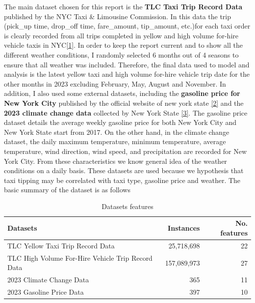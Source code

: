 \documentclass[11pt]{article}
\begin{document}
The main dataset chosen for this report is the \textbf{TLC Taxi Trip Record Data} published by the NYC Taxi \& Limousine Commission. In this data the trip 
(pick\_up time, drop\_off time, fare\_amount, tip\_amount, etc.)for each taxi order is clearly recorded from all trips completed in yellow and high volume for-hire 
vehicle taxis in NYC\href{https://www.nyc.gov/site/tlc/about/tlc-trip-record-data.page}{[1]}. In order to keep the report current and to show all the different weather 
conditions, I randomly selected 6 months out of 4 seasons to ensure that all weather was included. Therefore, the final data used to model and analysis is the latest 
yellow taxi and high volume for-hire vehicle trip date for the other months in 2023 excluding February, May, August and November.
In addition, I also used some external datasets, including the \textbf{gasoline price for New York City} published by the official website of new york state
\href{https://data.ny.gov/zh/Energy-Environment/Gasoline-Prices/wuxr-ni2i}{[2]} and the \textbf{2023 climate change data} collected by New York State
\href{https://meteostat.net/en/station/KNYC0?t=2023-01-01/2023-12-31}{[3]}. The gasoline price dataset 
details the average weekly gasoline price for both New York City and New York State start from 2017. On the other hand, in the climate change dataset, the daily maximum temperature, 
minimum temperature, average temperature, wind direction, wind speed, and precipitation are recorded for New York City. From these characteristics we know general 
idea of the weather conditions on a daily basis. These datasets are used because we hypothesis that taxi tipping may be correlated with taxi type, gasoline price and 
weather. The basic summary of the dataset is as follows

\begin{table}[ht]
    \centering
    \begin{tabular}{l r r}
    \hline
    \textbf{Datasets} & \textbf{Instances} & \textbf{No. features} \\
    \hline
    TLC Yellow Taxi Trip Record Data & 25,718,698 & 22 \\
    \hline
    TLC High Volume For-Hire Vehicle Trip Record Data & 157,089,973 & 27 \\
    \hline
    2023 Climate Change Data & 365 & 11 \\
    \hline
    2023 Gasoline Price Data & 397 & 10 \\
    \hline
    \end{tabular}
    \caption{Datasets features}
    \label{tab:datasets_features}
    \end{table}
\end{document}
